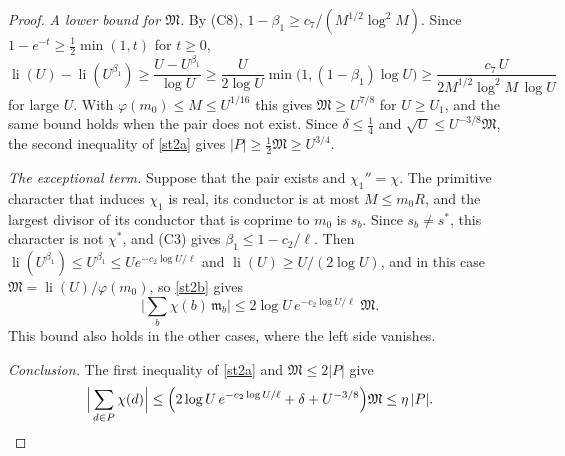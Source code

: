 \documentclass[11pt,letterpaper]{article}
\numberwithin{equation}{section}
\begin{document}
\begin{proof}
\emph{A lower bound for $\mathfrak M$.} By (C8), $1-\beta_1\ge c_7/(M^{1/2}\log^2M)$. Since $1-e^{-t}\ge\tfrac12\min(1,t)$ for $t\ge0$,
\[
\operatorname{li}(U)-\operatorname{li}(U^{\beta_1})\ge\frac{U-U^{\beta_1}}{\log U}\ge\frac U{2\log U}\min\big(1,(1-\beta_1)\log U\big)\ge\frac{c_7\,U}{2M^{1/2}\log^2M\,\log U}
\]
for large $U$. With $\varphi(m_0)\le M\le U^{1/16}$ this gives $\mathfrak M\ge U^{7/8}$ for $U\ge U_1$, and the same bound holds when the pair does not exist. Since $\delta\le\tfrac14$ and $\sqrt U\le U^{-3/8}\mathfrak M$, the second inequality of \eqref{st2a} gives $|P|\ge\tfrac12\mathfrak M\ge U^{3/4}$.

\emph{The exceptional term.} Suppose that the pair exists and $\chi_1''=\chi$. The primitive character that induces $\chi_1$ is real, its conductor is at most $M\le m_0R$, and the largest divisor of its conductor that is coprime to $m_0$ is $s_b$. Since $s_b\ne s^\ast$, this character is not $\chi^\ast$, and (C3) gives $\beta_1\le1-c_2/\ell$. Then $\operatorname{li}(U^{\beta_1})\le U^{\beta_1}\le Ue^{-c_2\log U/\ell}$ and $\operatorname{li}(U)\ge U/(2\log U)$, and in this case $\mathfrak M=\operatorname{li}(U)/\varphi(m_0)$, so \eqref{st2b} gives
\[
\Big|\sum_b\chi(b)\,\mathfrak m_b\Big|\le2\log U\,e^{-c_2\log U/\ell}\;\mathfrak M .
\]
This bound also holds in the other cases, where the left side vanishes.

\emph{Conclusion.} The first inequality of \eqref{st2a} and $\mathfrak M\le2|P|$ give
\[
\Big|\sum_{d\in P}\chi(d)\Big|\le\Big(2\log U\,e^{-c_2\log U/\ell}+\delta+U^{-3/8}\Big)\mathfrak M\le\eta\,|P| .\qedhere
\]
\end{proof}
\end{document}
